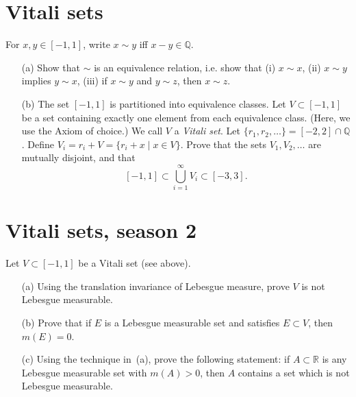 \documentclass[lang=cn,11pt]{elegantbook}
\begin{document}
\section{Vitali sets}
  For $x, y\in [-1,1]$, write $x\sim y$ iff $x-y\in \mathbb{Q}$. 
  \begin{itemize}
  \item[(a)]
    Show that $\sim$ is an equivalence relation, i.e. show that (i) $x\sim x$, (ii) $x\sim y$ implies $y\sim x$, (iii) if $x\sim y$ and $y\sim z$, then $x\sim z$.
  \item[(b)]
    The set $[-1,1]$ is partitioned into equivalence classes. Let $V\subset[-1,1]$ be a set containing exactly one element from each equivalence class. (Here, we use the Axiom of choice.) We call $V$ a \emph{Vitali set}. 
    Let $\{r_1, r_2,\dots\} =[-2,2]\cap \mathbb{Q}$. Define $V_i= r_i+V=\{r_i+x\mid x\in V\}$.
    Prove that the sets $V_1, V_2, \dots$ are mutually disjoint, and that 
    \[
      [-1, 1]\subset \bigcup_{i=1}^\infty V_i \subset [-3,3].
    \]
  \end{itemize}

\section{Vitali sets, season 2}
  Let $V\subset[-1,1]$ be a Vitali set (see above).
  \begin{itemize}
  \item[(a)]
    Using the translation invariance of Lebesgue measure, prove $V$ is not Lebesgue
    measurable.
  \item[(b)]
    Prove that if $E$ is a Lebesgue measurable set and satisfies $E\subset V$, then $m(E)=0$. 
  \item[(c)]
    Using the technique in~(a), prove the following statement: if $A\subset\mathbb{R}$ is any Lebesgue measurable set with $m(A)>0$, then $A$ contains a set which is not Lebesgue measurable. 
  \end{itemize}
\end{document}
